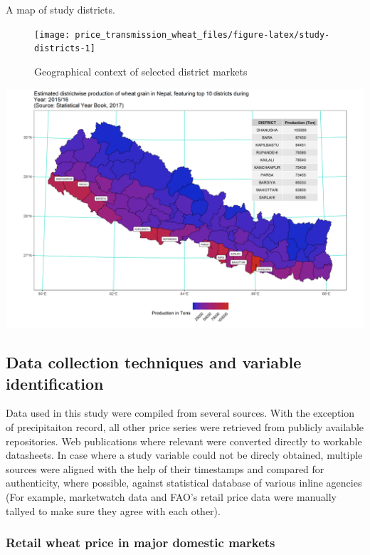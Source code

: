 \documentclass[12pt,]{article}
\begin{document}
A map of study districts.

\begin{figure}
\texttt{[image: price\_transmission\_wheat\_files/figure-latex/study-districts-1]} \caption{Geographical context of selected district markets}\label{fig:study-districts}
\end{figure}

\includegraphics{./outputs/npl_top_wheat_growing_districts_productionwise.png}

\hypertarget{data-collection-techniques-and-variable-identification}{%
\subsection{Data collection techniques and variable identification}\label{data-collection-techniques-and-variable-identification}}

Data used in this study were compiled from several sources. With the exception of precipitaiton record, all other price series were retrieved from publicly available repositories. Web publications where relevant were converted directly to workable datasheets. In case where a study variable could not be direcly obtained, multiple sources were aligned with the help of their timestamps and compared for authenticity, where possible, against statistical database of various inline agencies (For example, marketwatch data and FAO's retail price data were manually tallyed to make sure they agree with each other).

\hypertarget{retail-wheat-price-in-major-domestic-markets}{%
\subsubsection{Retail wheat price in major domestic markets}\label{retail-wheat-price-in-major-domestic-markets}}
\end{document}
